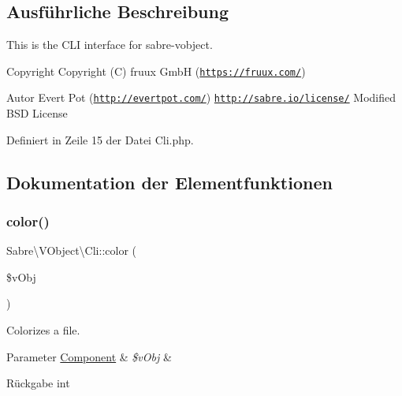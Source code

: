 \subsection{Ausführliche Beschreibung}
This is the C\+LI interface for sabre-\/vobject.

\begin{DoxyCopyright}{Copyright}
Copyright (C) fruux GmbH (\href{https://fruux.com/}{\tt https\+://fruux.\+com/}) 
\end{DoxyCopyright}
\begin{DoxyAuthor}{Autor}
Evert Pot (\href{http://evertpot.com/}{\tt http\+://evertpot.\+com/})  \href{http://sabre.io/license/}{\tt http\+://sabre.\+io/license/} Modified B\+SD License 
\end{DoxyAuthor}


Definiert in Zeile 15 der Datei Cli.\+php.



\subsection{Dokumentation der Elementfunktionen}
\mbox{\label{class_sabre_1_1_v_object_1_1_cli_a37d5b2f618505f105122850bc05308cd}} 
\subsubsection{\texorpdfstring{color()}{color()}}
{\footnotesize\ttfamily Sabre\textbackslash{}\+V\+Object\textbackslash{}\+Cli\+::color (\begin{DoxyParamCaption}\item[{}]{\$v\+Obj }\end{DoxyParamCaption})\hspace{0.3cm}{\ttfamily [protected]}}

Colorizes a file.


\begin{DoxyParams}[1]{Parameter}
\mbox{\hyperlink{class_sabre_1_1_v_object_1_1_component}{Component}} & {\em \$v\+Obj} & \\
\hline
\end{DoxyParams}
\begin{DoxyReturn}{Rückgabe}
int 
\end{DoxyReturn}


